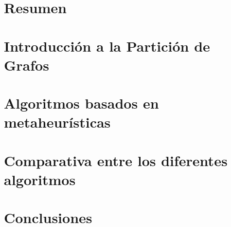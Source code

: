 \documentclass[a4paper,10pt,twoside]{report}
\author{\me}
\begin{document}


\normalsize

\chapter*{Resumen}\label{chapter:Resumen}
\setcounter{page}{0}


\tableofcontents

\chapter{Introducción a la Partición de Grafos}\label{chapter:Introducción}


\chapter{Algoritmos basados en metaheurísticas}\label{chapter:Algoritmos}


\chapter{Comparativa entre los diferentes algoritmos}\label{chapter:Comparativa}


\chapter{Conclusiones}\label{chapter:Conclusiones}


\renewcommand{\bibname}{Bibliografia}


\end{document}
